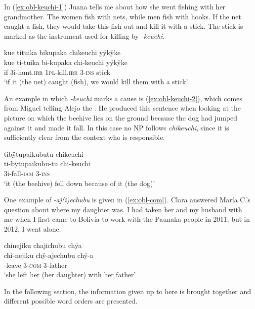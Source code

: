 In (\ref{ex:obl-keuchi-1}) Juana tells me about how she went fishing with her grandmother. The women fish with nets, while men fish with hooks. If the net caught a fish, they would take this fish out and kill it with a stick. The stick is marked as the instrument used for killing by \textit{-keuchi}.

\ea\label{ex:obl-keuchi-1}
\begingl
\glpreamble kue tituika bikupaka chikeuchi yÿkÿke\\
\gla kue ti-tuika bi-kupaka chi-keuchi yÿkÿke\\
\glb if 3i-hunt.\textsc{irr} 1\textsc{pl}-kill.\textsc{irr} 3-\textsc{ins} stick\\
\glft ‘if it (the net) caught (fish), we would kill them with a stick’
\endgl
\trailingcitation{[jxx-p120430l-1.073]}
\xe

An example in which \textit{-keuchi} marks a cause is (\ref{ex:obl-keuchi-2}), which comes from Miguel telling Alejo the . He produced this sentence when looking at the picture on which the beehive lies on the ground because the dog had jumped against it and made it fall. In this case no NP follows \textit{chikeuchi}, since it is sufficiently clear from the context who is responsible. 

\ea\label{ex:obl-keuchi-2}
\begingl
\glpreamble tibÿtupaikubutu chikeuchi\\
\gla ti-bÿtupaikubu-tu chi-keuchi\\
\glb 3i-fall-\textsc{iam} 3-\textsc{ins}\\
\glft ‘it (the beehive) fell down because of it (the dog)’
\endgl
\trailingcitation{[mtx-a110906l.104]}
\xe
{}

One example of \textit{-aj(i)echubu} is given in (\ref{ex:obl-com}). Clara answered María C.’s question about where my daughter was. I had taken her and my husband with me when I first came to Bolivia to work with the Paunaka people in 2011, but in 2012, I went alone.

\ea\label{ex:obl-com}
\begingl
\glpreamble chinejiku chajichubu chÿa\\
\gla chi-nejiku chÿ-ajechubu chÿ-a\\
-leave 3-\textsc{com} 3-father\\
\glft ‘she left her (her daughter) with her father’
\endgl
\trailingcitation{[cux-120410ls.081]}
\xe


In the following section, the information given up to here is brought together and different possible word orders are presented.

